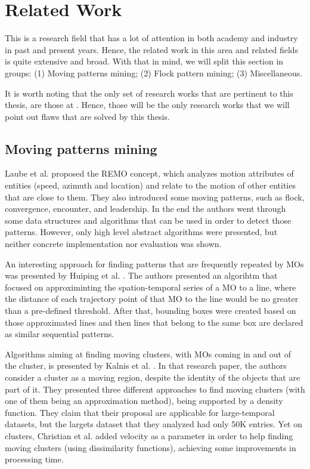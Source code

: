 \chapter{Related Work}
\label{chp:relatedwork}
This is a research field that has a lot of attention in both academy and industry in past and present years. Hence, the
related work in this area and related fields is quite extensive and broad. With that in mind, we will split this section
in groups: (1) Moving patterns mining; (2) Flock pattern mining; (3) Miscellaneous.

It is worth noting that the only set of research works that are pertinent to this thesis, are those at
. Hence, those will be the only research works that we will point out flaws that are solved by
this thesis.

\section{Moving patterns mining}
\label{sec:rel_moving}
Laube et al. \citep{remo} proposed the REMO concept, which analyzes motion attributes of entities
(speed, azimuth and location) and relate to the motion of other entities that are close to them. They also introduced
some moving patterns, such as flock, convergence, encounter, and leadership. In the end the authors went through some
data structures and algorithms that can be used in order to detect those patterns. However, only high level abstract
algorithms were presented, but neither concrete implementation nor evaluation was shown.

An interesting approach for finding patterns that are frequently repeated by MOs was presented by Huiping et al.
\citep{frequentpatterns}. The authors presented an algorihtm that focused on approximinting the spation-temporal series
of a MO to a line, where the distance of each trajectory point of that MO to the line would be no greater than a
pre-defined threshold. After that, bounding boxes were created based on those approximated lines and then lines that
belong to the same box are declared as similar sequential patterns.

Algorithms aiming at finding moving clusters, with MOs coming in and out of the cluster, is presented by Kalnis et al.
\citep{movingclusters}. In that research paper, the authors consider a cluster as a moving region, despite the identity
of the objects that are part of it. They presented three different approaches to find moving clusters (with one of them
being an approximation method), being supported by a density function. They claim that their proposal are applicable for
large-temporal datasets, but the largets dataset that they analyzed had only 50K entries. Yet on clusters, Christian et
al. \citep{clusters3} added velocity as a parameter in order to help finding moving clusters (using dissimilarity
functions), achieving some improvements in processing time.

